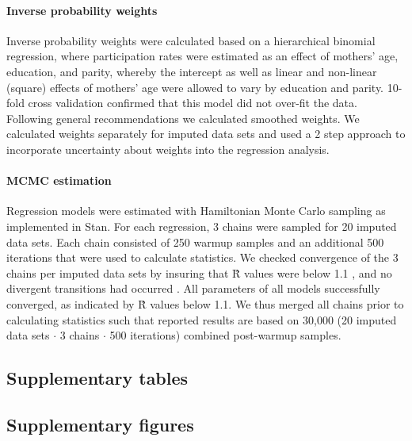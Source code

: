 \documentclass[]{article}
\begin{document}
\paragraph{Inverse probability weights} 
Inverse probability weights were calculated based on a hierarchical binomial regression, where participation rates were estimated as an effect of mothers' age, education, and parity,  whereby the intercept as well as linear and non-linear (square) effects of mothers' age were allowed to vary by education and parity. 10-fold cross validation confirmed that this model did not over-fit the data. Following general recommendations we calculated smoothed weights\supercite{Seaman2013-rj}. We calculated weights separately for imputed data sets and used a 2 step approach\supercite{Zigler2016-od} to incorporate uncertainty about weights into the regression analysis.

\paragraph{MCMC estimation} 

Regression models were estimated with Hamiltonian Monte Carlo sampling as implemented in Stan. For each regression, 3 chains were sampled for 20 imputed data sets. Each chain consisted of 250 warmup samples and an additional 500 iterations that were used to calculate statistics. We checked convergence of the 3 chains per imputed data sets by insuring that \^{R} values were below 1.1 \supercite{Gelman1992-jz}, and no divergent transitions had occurred \supercite{Stan_Development_Team2016-pc}. All parameters of all models successfully converged, as indicated by \^{R} values below 1.1. We thus merged all chains prior to calculating statistics\supercite{Zhou2010-li} such that reported results are based on 30,000 (20 imputed data sets $\cdot$ 3 chains $\cdot$ 500 iterations) combined post-warmup samples.

\subsection{Supplementary tables}





\newpage

\subsection{Supplementary figures}
\end{document}
